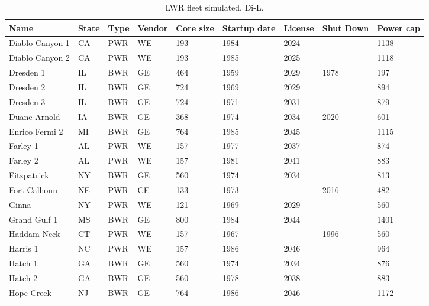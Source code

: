 \begin{table}[H]
    \centering
    \caption{LWR fleet simulated, Di-L.}
    \label{tab:lwr_fleet2}
    \begin{tabular}{l l l l l l l l l}
    \hline
    \textbf{Name} & \textbf{State} & \textbf{Type} & \textbf{Vendor} & \textbf{Core size} & \textbf{Startup date} & \textbf{License} & \textbf{Shut Down} & \textbf{Power cap} \\
    \hline
    Diablo Canyon 1       &CA & PWR & WE   & 193 & 1984 & 2024 &      & 1138\\
    Diablo Canyon 2       &CA & PWR & WE   & 193 & 1985 & 2025 &      & 1118\\
    Dresden 1             &IL & BWR & GE   & 464 & 1959 & 2029 & 1978 & 197 \\
    Dresden 2             &IL & BWR & GE   & 724 & 1969 & 2029 &      & 894 \\
    Dresden 3             &IL & BWR & GE   & 724 & 1971 & 2031 &      & 879 \\
    Duane Arnold          &IA & BWR & GE   & 368 & 1974 & 2034 & 2020 & 601 \\
    Enrico Fermi 2        &MI & BWR & GE   & 764 & 1985 & 2045 &      & 1115\\
    Farley 1              &AL & PWR & WE   & 157 & 1977 & 2037 &      & 874 \\
    Farley 2              &AL & PWR & WE   & 157 & 1981 & 2041 &      & 883 \\
    Fitzpatrick           &NY & BWR & GE   & 560 & 1974 & 2034 &      & 813 \\
    Fort Calhoun          &NE & PWR & CE   & 133 & 1973 &      & 2016 & 482 \\
    Ginna                 &NY & PWR & WE   & 121 & 1969 & 2029 &      & 560 \\
    Grand Gulf 1          &MS & BWR & GE   & 800 & 1984 & 2044 &      & 1401\\
    Haddam Neck           &CT & PWR & WE   & 157 & 1967 &      & 1996 & 560 \\
    Harris 1              &NC & PWR & WE   & 157 & 1986 & 2046 &      & 964 \\
    Hatch 1               &GA & BWR & GE   & 560 & 1974 & 2034 &      & 876 \\
    Hatch 2               &GA & BWR & GE   & 560 & 1978 & 2038 &      & 883 \\
    Hope Creek            &NJ & BWR & GE   & 764 & 1986 & 2046 &      & 1172\\

\end{tabular}
\end{table}

